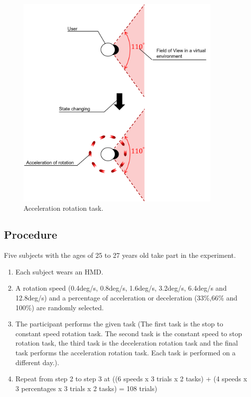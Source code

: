 \begin{figure}[H]\centering
	\includegraphics[width=0.9\textwidth]{Pictures/Equipment 1 Acceleration Task.png}%
	\caption{Acceleration rotation task.}\label{fig:Equipment 1 Acceleration Task}%
\end{figure}
\newpage
\subsection{Procedure} 
Five subjects with the ages of 25 to 27 years old take part in the experiment.
\begin{enumerate}
	\item Each subject wears an HMD.
	\item A rotation speed (0.4deg/s, 0.8deg/s, 1.6deg/s, 3.2deg/s, 6.4deg/s and 12.8deg/s) and a percentage of acceleration or deceleration (33\%,66\% and 100\%) are randomly selected.
	\item The participant performs the given task (The first task is the stop to constant speed rotation task. The second task is the constant speed to stop rotation task, the third task is the deceleration rotation task and the final task performs the acceleration rotation task. Each task is performed on a different day.).
	\item Repeat from step 2 to step 3 at ((6 speeds x 3 trials x 2 tasks) + (4 speeds x 3 percentages x 3 trials x 2 tasks) = 108 trials)
\end{enumerate}

